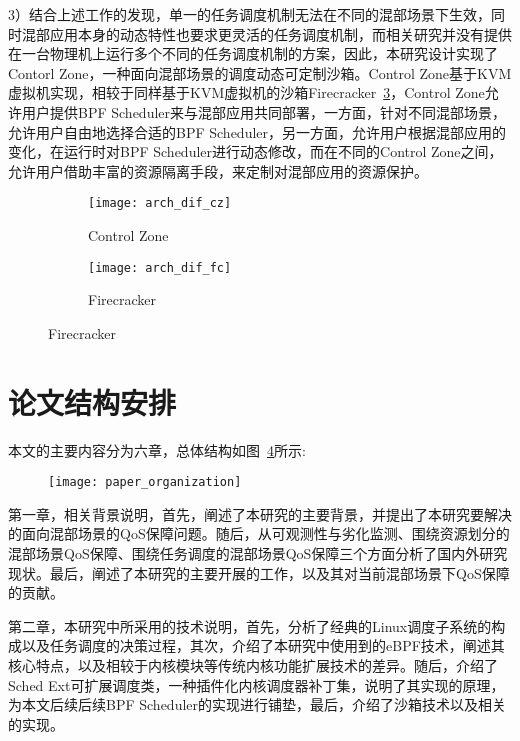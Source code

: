 3）结合上述工作的发现，单一的任务调度机制无法在不同的混部场景下生效，同时混部应用本身的动态特性也要求更灵活的任务调度机制，而相关研究并没有提供在一台物理机上运行多个不同的任务调度机制的方案，因此，本研究设计实现了Contorl Zone，一种面向混部场景的调度动态可定制沙箱。Control Zone基于KVM虚拟机实现，相较于同样基于KVM虚拟机的沙箱Firecracker~\ref{fig:arch_dif}，Control Zone允许用户提供BPF Scheduler来与混部应用共同部署，一方面，针对不同混部场景，允许用户自由地选择合适的BPF Scheduler，另一方面，允许用户根据混部应用的变化，在运行时对BPF Scheduler进行动态修改，而在不同的Control Zone之间，允许用户借助丰富的资源隔离手段，来定制对混部应用的资源保护。

\begin{figure}[!htbp]
    \centering
    \begin{subfigure}[b]{0.45\textwidth}
        \texttt{[image: arch\_dif\_cz]}
        \caption{Control Zone}
        \label{fig:arch_dif_cz}
    \end{subfigure}
    \hfill
    \begin{subfigure}[b]{0.45\textwidth}
        \texttt{[image: arch\_dif\_fc]}
        \caption{Firecracker}
        \label{fig:arch_dif_fc}
    \end{subfigure}
\label{fig:arch_dif}
\end{figure}

\section{论文结构安排}

本文的主要内容分为六章，总体结构如图~\ref{fig:paper_organization}所示:

\begin{figure}[!htbp]
    \centering
    \texttt{[image: paper\_organization]}
    \label{fig:paper_organization}
\end{figure}

第一章，相关背景说明，首先，阐述了本研究的主要背景，并提出了本研究要解决的面向混部场景的QoS保障问题。随后，从可观测性与劣化监测、围绕资源划分的混部场景QoS保障、围绕任务调度的混部场景QoS保障三个方面分析了国内外研究现状。最后，阐述了本研究的主要开展的工作，以及其对当前混部场景下QoS保障的贡献。

第二章，本研究中所采用的技术说明，首先，分析了经典的Linux调度子系统的构成以及任务调度的决策过程，其次，介绍了本研究中使用到的eBPF技术，阐述其核心特点，以及相较于内核模块等传统内核功能扩展技术的差异。随后，介绍了Sched Ext可扩展调度类，一种插件化内核调度器补丁集，说明了其实现的原理，为本文后续后续BPF Scheduler的实现进行铺垫，最后，介绍了沙箱技术以及相关的实现。

